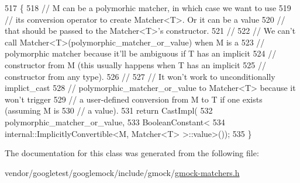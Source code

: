 \begin{DoxyCode}
517                                                                 \{
518     \textcolor{comment}{// M can be a polymorhic matcher, in which case we want to use}
519     \textcolor{comment}{// its conversion operator to create Matcher<T>.  Or it can be a value}
520     \textcolor{comment}{// that should be passed to the Matcher<T>'s constructor.}
521     \textcolor{comment}{//}
522     \textcolor{comment}{// We can't call Matcher<T>(polymorphic\_matcher\_or\_value) when M is a}
523     \textcolor{comment}{// polymorphic matcher because it'll be ambiguous if T has an implicit}
524     \textcolor{comment}{// constructor from M (this usually happens when T has an implicit}
525     \textcolor{comment}{// constructor from any type).}
526     \textcolor{comment}{//}
527     \textcolor{comment}{// It won't work to unconditionally implict\_cast}
528     \textcolor{comment}{// polymorphic\_matcher\_or\_value to Matcher<T> because it won't trigger}
529     \textcolor{comment}{// a user-defined conversion from M to T if one exists (assuming M is}
530     \textcolor{comment}{// a value).}
531     \textcolor{keywordflow}{return} CastImpl(
532         polymorphic\_matcher\_or\_value,
533         BooleanConstant<
534             internal::ImplicitlyConvertible<M, Matcher<T> >::value>());
535   \}
\end{DoxyCode}


The documentation for this class was generated from the following file\+:\begin{DoxyCompactItemize}
\item 
vendor/googletest/googlemock/include/gmock/\hyperlink{gmock-matchers_8h}{gmock-\/matchers.\+h}\end{DoxyCompactItemize}
